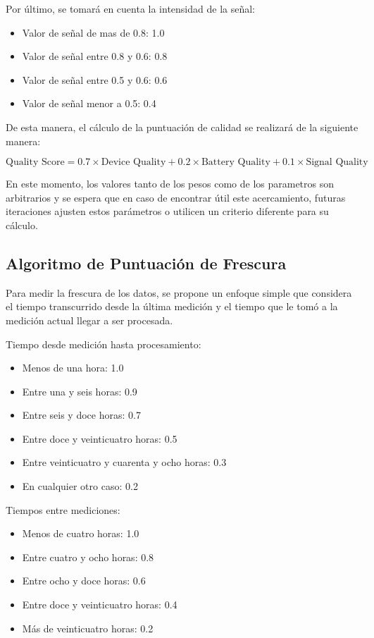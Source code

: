 Por último, se tomará en cuenta la intensidad de la señal:
\begin{itemize}
    \item Valor de señal de mas de 0.8: 1.0
    \item Valor de señal entre 0.8 y 0.6: 0.8
    \item Valor de señal entre 0.5 y 0.6: 0.6
    \item Valor de señal menor a 0.5: 0.4
\end{itemize}

De esta manera, el cálculo de la puntuación de calidad se realizará de la siguiente manera:


\begin{equation}
    \text{Quality Score} = 0.7 \times \text{Device Quality} + 0.2 \times \text{Battery Quality} + 0.1 \times \text{Signal Quality}
\end{equation}


En este momento, los valores tanto de los pesos como de los parametros son arbitrarios y se espera que en caso de encontrar útil este acercamiento, 
futuras iteraciones ajusten estos parámetros o utilicen un criterio diferente para su cálculo.

\subsection{Algoritmo de Puntuación de Frescura}

Para medir la frescura de los datos, se propone un enfoque simple que considera el tiempo transcurrido desde la última medición 
y el tiempo que le tomó a la medición actual llegar a ser procesada.

Tiempo desde medición hasta procesamiento:
\begin{itemize}
    \item Menos de una hora: 1.0
    \item Entre una y seis horas: 0.9
    \item Entre seis y doce horas: 0.7
    \item Entre doce y veinticuatro horas: 0.5
    \item Entre veinticuatro y cuarenta y ocho horas: 0.3
    \item En cualquier otro caso: 0.2
\end{itemize}

Tiempos entre mediciones:
\begin{itemize}
    \item Menos de cuatro horas: 1.0
    \item Entre cuatro y ocho horas: 0.8
    \item Entre ocho y doce horas: 0.6
    \item Entre doce y veinticuatro horas: 0.4
    \item Más de veinticuatro horas: 0.2
\end{itemize}

